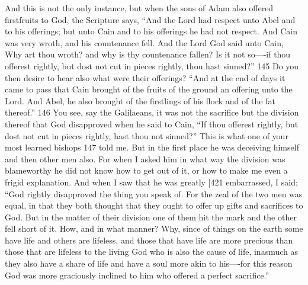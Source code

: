 And this is not the only instance, but when the sons of Adam also offered firstfruits to God, the Scripture says, ``And the Lord had respect unto Abel and to his offerings; but unto Cain and to his offerings he had not respect. And Cain was very wroth, and his countenance fell. And the Lord God said unto Cain, Why art thou wroth? and why is thy countenance fallen? Is it not so----if thou offerest rightly, but dost not cut in pieces rightly, thou hast sinned?''
145 Do you then desire to hear also what were their offerings? ``And at the end of days it came to pass that Cain brought of the fruits of the ground an offering unto the Lord. And Abel, he also brought of the firstlings of his
flock and of the fat thereof.'' 146 You see, say the Galilaeans, it was not the sacrifice but the division thereof that God disapproved when he said to Cain, ``If thou offerest rightly, but dost not cut in pieces rightly, hast thou not sinned?'' This is what one of your most learned bishops
147 told me. But in the first place he was deceiving himself and then other men also. For when I asked him in what way the division was blameworthy he did not know how to get out of it, or how to make me even a frigid explanation. And when I saw that he was greatly
|421 embarrassed, I said; ``God rightly disapproved the thing you speak of. For the zeal of the two men was equal, in that they both thought that they ought to offer up gifts and sacrifices to God. But in the matter of their division one of them hit the mark and the other fell short of it. How, and in what manner? Why, since of things on the earth some have life and others are lifeless, and those that have life are more precious than those that are lifeless to the living God who is also the cause of life, inasmuch as they also have a share of life and have a soul more akin to his----for this reason God was more graciously inclined to him who offered a perfect sacrifice.''


